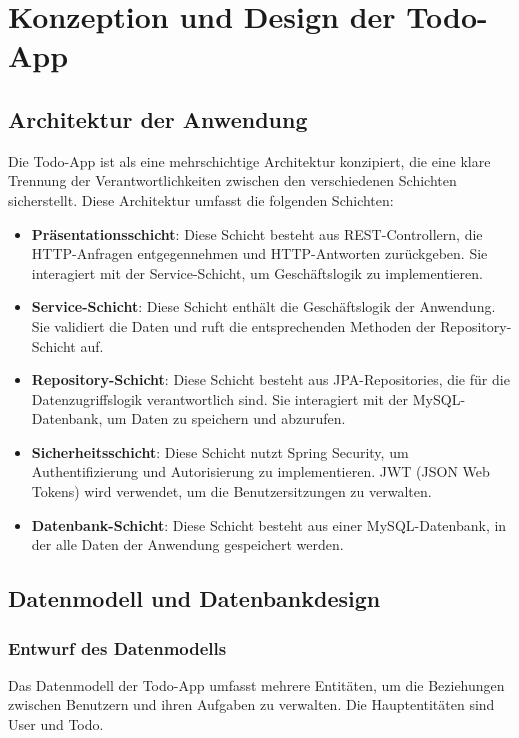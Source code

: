 \chapter{Konzeption und Design der Todo-App}
\section{Architektur der Anwendung}
Die Todo-App ist als eine mehrschichtige Architektur konzipiert, die eine klare Trennung der Verantwortlichkeiten zwischen den verschiedenen Schichten sicherstellt. Diese Architektur umfasst die folgenden Schichten:

\begin{itemize}
	\item \textbf{Präsentationsschicht}: Diese Schicht besteht aus REST-Controllern, die HTTP-Anfragen entgegennehmen und HTTP-Antworten zurückgeben. Sie interagiert mit der Service-Schicht, um Geschäftslogik zu implementieren.
	\item \textbf{Service-Schicht}: Diese Schicht enthält die Geschäftslogik der Anwendung. Sie validiert die Daten und ruft die entsprechenden Methoden der Repository-Schicht auf.
	\item \textbf{Repository-Schicht}: Diese Schicht besteht aus JPA-Repositories, die für die Datenzugriffslogik verantwortlich sind. Sie interagiert mit der MySQL-Datenbank, um Daten zu speichern und abzurufen.
	\item \textbf{Sicherheitsschicht}: Diese Schicht nutzt Spring Security, um Authentifizierung und Autorisierung zu implementieren. JWT (JSON Web Tokens) wird verwendet, um die Benutzersitzungen zu verwalten.
	\item \textbf{Datenbank-Schicht}: Diese Schicht besteht aus einer MySQL-Datenbank, in der alle Daten der Anwendung gespeichert werden.
\end{itemize}

\section{Datenmodell und Datenbankdesign}

\subsection{Entwurf des Datenmodells}
Das Datenmodell der Todo-App umfasst mehrere Entitäten, um die Beziehungen zwischen Benutzern und ihren Aufgaben zu verwalten. Die Hauptentitäten sind User und Todo.

